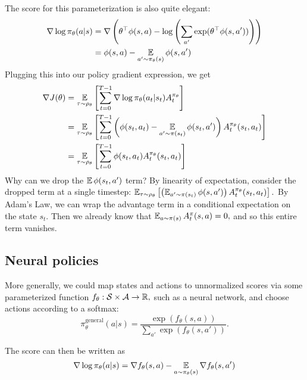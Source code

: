 \documentclass[../main/main]{subfiles}
\begin{document}
The score for this parameterization is also quite elegant: \begin{equation*}
    \begin{split}
        \nabla \log \pi_\theta(a|s) &= \nabla \left( \theta^\top \phi(s, a) - \log \left( \sum_{a'} \exp(\theta^\top \phi(s, a')) \right) \right) \\
        &= \phi(s, a) - \operatorname*{\mathbb{E}}_{a' \sim \pi_\theta(s)} \phi(s, a')
    \end{split}
\end{equation*}
Plugging this into our policy gradient expression, we get \begin{align*}
    \nabla J(\theta) &= \operatorname*{\mathbb{E}}_{\tau \sim \rho_\theta} \left[
        \sum_{t=0}^{T-1} \nabla \log \pi_\theta(a_t | s_t) A_t^{\pi_\theta}
    \right] \\
    &= \operatorname*{\mathbb{E}}_{\tau \sim \rho_\theta} \left[
        \sum_{t=0}^{T-1} \left( \phi(s_t, a_t) - \operatorname*{\mathbb{E}}_{a' \sim \pi(s_t)} \phi(s_t, a') \right) A_t^{\pi_\theta}(s_t, a_t)
    \right] \\
    &= \operatorname*{\mathbb{E}}_{\tau \sim \rho_\theta} \left[ \sum_{t=0}^{T-1} \phi(s_t, a_t) A_t^{\pi_\theta} (s_t, a_t) \right]
\end{align*}
Why can we drop the $\operatorname*{\mathbb{E}} \phi(s_t, a')$ term? By linearity of expectation, consider the dropped term at a single timestep: $\operatorname*{\mathbb{E}}_{\tau \sim \rho_\theta} \left[ \left( \operatorname*{\mathbb{E}}_{a' \sim \pi(s_t)} \phi(s, a') \right) A_t^{\pi_\theta}(s_t, a_t) \right].$ By Adam's Law, we can wrap the advantage term in a conditional expectation on the state $s_t.$ Then we already know that $\operatorname*{\mathbb{E}}_{a \sim \pi(s)} A_t^{\pi}(s, a) = 0,$ and so this entire term vanishes.

\subsection{Neural policies}

More generally, we could map states and actions to unnormalized scores via some parameterized function $f_\theta : \mathcal{S} \times \mathcal{A} \to \mathbb{R},$ such as a neural network, and choose actions according to a softmax: \[
    \pi^\text{general}_\theta(a|s) = \frac{\exp(f_{\theta}(s,a))}{\sum_{a'} \exp(f_{\theta}(s,a'))}.
\]

The score can then be written as \[
    \nabla \log \pi_\theta(a|s) = \nabla f_\theta(s, a) - \operatorname*{\mathbb{E}}_{a \sim \pi_\theta(s)} \nabla f_\theta (s, a')
\]
\end{document}
